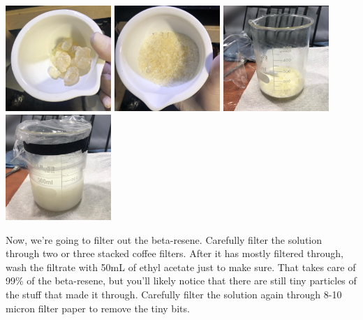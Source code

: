 \documentclass[11pt]{article}
\begin{document}
\begin{center}
\includegraphics[width=4cm, height=4cm]{img/part1_34.jpg}
\includegraphics[width=4cm, height=4cm]{img/part1_35.jpg}
\includegraphics[width=4cm, height=4cm]{img/part1_36.jpg}
\includegraphics[width=4cm, height=4cm]{img/part1_37.jpg}
\end{center}

Now, we're going to filter out the beta-resene. Carefully filter the solution through two or three stacked coffee filters. After it has mostly filtered through, wash the filtrate with 50mL of ethyl acetate just to make sure. That takes care of 99\% of the beta-resene, but you'll likely notice that there are still tiny particles of the stuff that made it through. Carefully filter the solution again through 8-10 micron filter paper to remove the tiny bits.\newline
 
\end{document}
